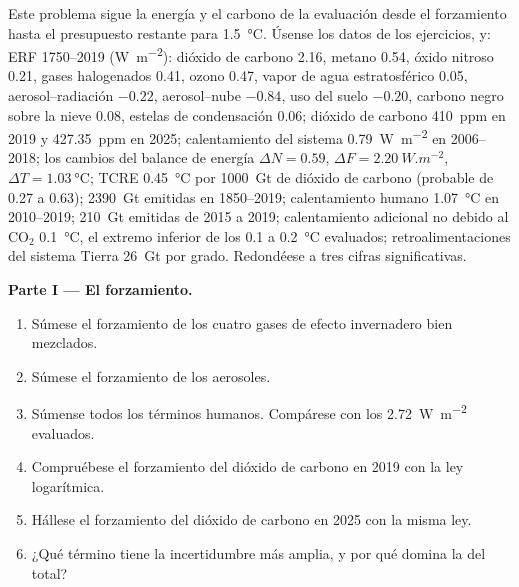 \begin{problem}\label{pb:b2:anthropogenic-climate-change:1}
Este problema sigue la energía y el carbono de la evaluación desde el forzamiento hasta el presupuesto
restante para \qty{1.5}{\celsius}. Úsense los datos de los ejercicios, y: ERF 1750--2019 (\unit{W.m^{-2}}):
dióxido de carbono 2.16, metano 0.54, óxido nitroso 0.21, gases halogenados 0.41, ozono 0.47,
vapor de agua estratosférico 0.05, aerosol--radiación $-0.22$, aerosol--nube $-0.84$, uso del suelo
$-0.20$, carbono negro sobre la nieve 0.08, estelas de condensación 0.06; dióxido de carbono \qty{410}{ppm} en 2019 y
\qty{427.35}{ppm} en 2025; calentamiento del sistema \qty{0.79}{W.m^{-2}} en 2006--2018; los cambios del balance de energía
$\Delta N = 0.59$, $\Delta F = \qty{2.20}{W.m^{-2}}$, $\Delta T = \qty{1.03}{\celsius}$; TCRE
\qty{0.45}{\celsius} por \qty{1000}{Gt} de dióxido de carbono (probable de 0.27 a 0.63); \qty{2390}{Gt}
emitidas en 1850--2019; calentamiento humano \qty{1.07}{\celsius} en 2010--2019; \qty{210}{Gt} emitidas de
2015 a 2019; calentamiento adicional no debido al CO$_2$ \qty{0.1}{\celsius}, el extremo inferior de los 0.1
a \qty{0.2}{\celsius} evaluados; retroalimentaciones del sistema Tierra \qty{26}{Gt} por grado. Redondéese a tres cifras
significativas.

\noindent\textbf{Parte I --- El forzamiento.}
\begin{enumerate}
  \item Súmese el forzamiento de los cuatro gases de efecto invernadero bien mezclados.
  \item Súmese el forzamiento de los aerosoles.
  \item Súmense todos los términos humanos. Compárese con los \qty{2.72}{W.m^{-2}} evaluados.
  \item Compruébese el forzamiento del dióxido de carbono en 2019 con la ley logarítmica.
  \item Hállese el forzamiento del dióxido de carbono en 2025 con la misma ley.
  \item ¿Qué término tiene la incertidumbre más amplia, y por qué domina la del total?
\end{enumerate}


\end{problem}
